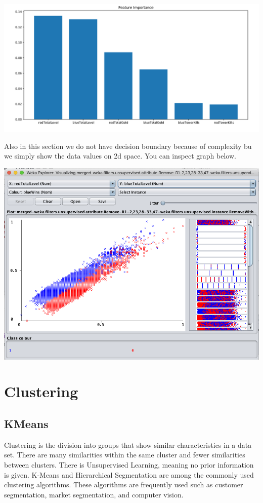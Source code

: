 \documentclass[a4paper]{article}
\begin{document}
\includegraphics[width=.9\linewidth]{graphs/mlpclassifier_feature_importance.pdf}

\pagebreak

Also in this section we do not have decision boundary because of complexity bu we simply show the data values on 2d space. You can inspect graph below.

\includegraphics[width=.9\linewidth]{graphs/mlpclassifier_feature_graph.png} %


\section{Clustering}

\subsection{KMeans}

Clustering is the division into groups that show similar characteristics in a data set. There are many similarities within the same cluster and fewer similarities between clusters. There is Unsupervised Learning, meaning no prior information is given. K-Means and Hierarchical Segmentation are among the commonly used clustering algorithms. These algorithms are frequently used such as customer segmentation, market segmentation, and computer vision.
\medskip
\end{document}

